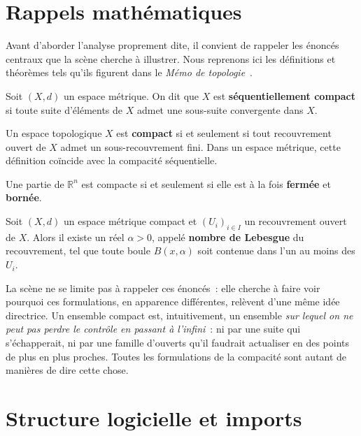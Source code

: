\documentclass[12pt, a4paper, openany]{report}
\begin{document}
	\section{Rappels mathématiques}

	Avant d’aborder l’analyse proprement dite, il convient de rappeler les énoncés centraux que la scène cherche à illustrer. Nous reprenons ici les définitions et théorèmes tels qu’ils figurent dans le \textit{Mémo de topologie}~\cite{lerouxklopp}.

	\begin{definition}[title={Compacité séquentielle}]
		Soit $(X,d)$ un espace métrique. On dit que $X$ est \textbf{séquentiellement compact} si toute suite d’éléments de $X$ admet une sous-suite convergente dans $X$.
	\end{definition}

	\begin{definition}[title={Théorème de Borel--Lebesgue}]
		Un espace topologique $X$ est \textbf{compact} si et seulement si tout recouvrement ouvert de $X$ admet un sous-recouvrement fini. Dans un espace métrique, cette définition coïncide avec la compacité séquentielle.
	\end{definition}

	\begin{definition}[title={Théorème de Heine--Borel}]
		Une partie de $\mathbb{R}^n$ est compacte si et seulement si elle est à la fois \textbf{fermée} et \textbf{bornée}.
	\end{definition}

	\begin{definition}[title={Lemme de Lebesgue}]
		Soit $(X,d)$ un espace métrique compact et $(U_i)_{i\in I}$ un recouvrement ouvert de $X$. Alors il existe un réel $\alpha>0$, appelé \textbf{nombre de Lebesgue} du recouvrement, tel que toute boule $B(x,\alpha)$ soit contenue dans l’un au moins des $U_i$.
	\end{definition}

	La scène ne se limite pas à rappeler ces énoncés~: elle cherche à faire voir pourquoi ces formulations, en apparence différentes, relèvent d’une même idée directrice. Un ensemble compact est, intuitivement, un ensemble \emph{sur lequel on ne peut pas perdre le contrôle en passant à l’infini}~: ni par une suite qui s’échapperait, ni par une famille d’ouverts qu’il faudrait actualiser en des points de plus en plus proches. Toutes les formulations de la compacité sont autant de manières de dire cette chose.
	
	\section{Structure logicielle et imports}
\end{document}
